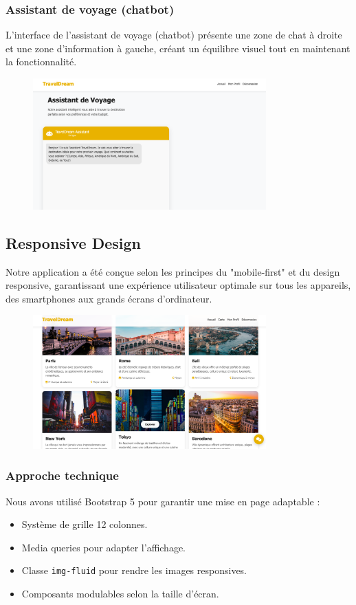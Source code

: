 \documentclass[a4paper,12pt]{article}
\begin{document}
\subsubsection{Assistant de voyage (chatbot)}
L'interface de l'assistant de voyage (chatbot) présente une zone de chat à droite et une
zone d'information à gauche, créant un équilibre visuel tout en maintenant la
fonctionnalité.
\begin{figure}[H]
    \centering
    \includegraphics[width=0.8\textwidth]{chat.png}
\end{figure}
\subsection{Responsive Design}
Notre application a été conçue selon les principes du "mobile-first" et du design
responsive, garantissant une expérience utilisateur optimale sur tous les appareils, des
smartphones aux grands écrans d'ordinateur.
\begin{figure}[H]
    \centering
    \includegraphics[width=0.8\textwidth]{design.png}
\end{figure}

\subsubsection{Approche technique}
Nous avons utilisé Bootstrap 5 pour garantir une mise en page adaptable :
\begin{itemize}
  \item Système de grille 12 colonnes.
  \item Media queries pour adapter l’affichage.
  \item Classe \texttt{img-fluid} pour rendre les images responsives.
  \item Composants modulables selon la taille d’écran.
\end{itemize}
\end{document}
